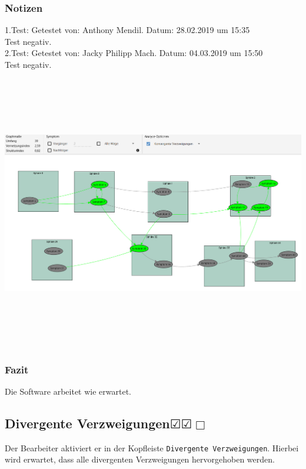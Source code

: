 \documentclass[enabledeprecatedfontcommands]{scrartcl}
\newcommand{\subsectiont}[2]{\subsection[#1]{#1{\normalsize\normalfont #2}}}
\newcommand{\leer}{$\Box$}
\newcommand{\ok}{$\CheckedBox$}
\begin{document}
\subsubsection{Notizen}
1.Test: Getestet von: Anthony Mendil. Datum: 28.02.2019 um 15:35 \\
Test negativ. \\
2.Test: Getestet von: Jacky Philipp Mach. Datum: 04.03.2019 um 15:50 \\
Test negativ.
\begin{center}
\includegraphics[height=12cm, angle=90]{analysekonvergenteVerzweigungen.PNG}
\end{center}
\subsubsection{Fazit}
Die Software arbeitet wie erwartet.

\subsectiont{Divergente Verzweigungen}{\dotfill\ok\ok\leer}
Der Bearbeiter aktiviert er in der Kopfleiste \texttt{Divergente Verzweigungen}. Hierbei wird erwartet, dass alle divergenten Verzweigungen hervorgehoben werden. 
\end{document}
